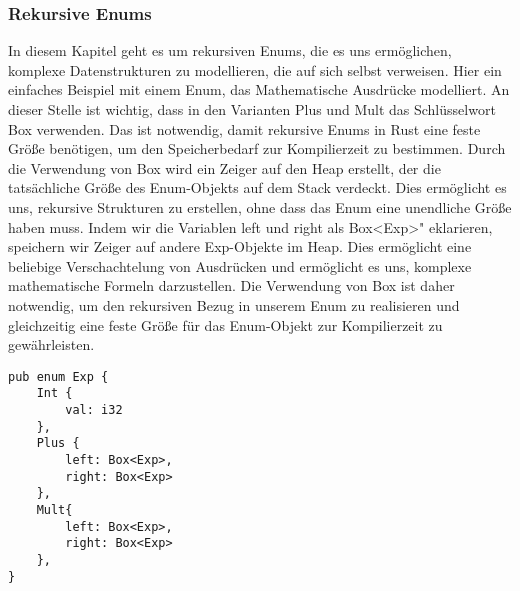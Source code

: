 \documentclass[a4paper, 1ppt]{article}
\begin{document}
\subsubsection{Rekursive Enums}
In diesem Kapitel geht es um rekursiven Enums, die es uns ermöglichen, komplexe Datenstrukturen zu modellieren, die auf sich selbst verweisen. 
Hier ein einfaches Beispiel mit einem Enum, das Mathematische Ausdrücke modelliert.
An dieser Stelle ist wichtig, dass in den Varianten Plus und Mult das Schlüsselwort Box verwenden. Das ist notwendig, damit rekursive Enums in Rust eine feste Größe benötigen, um den Speicherbedarf zur Kompilierzeit zu bestimmen. Durch die Verwendung von Box wird ein Zeiger auf den Heap erstellt, der die tatsächliche Größe des Enum-Objekts auf dem Stack verdeckt. Dies ermöglicht es uns, rekursive Strukturen zu erstellen, ohne dass das Enum eine unendliche Größe haben muss.
Indem wir die Variablen left und right als Box<Exp>" eklarieren, speichern wir Zeiger auf andere Exp-Objekte im Heap. Dies ermöglicht eine beliebige Verschachtelung von Ausdrücken und ermöglicht es uns, komplexe mathematische Formeln darzustellen.
Die Verwendung von Box ist daher notwendig, um den rekursiven Bezug in unserem Enum zu realisieren und gleichzeitig eine feste Größe für das Enum-Objekt zur Kompilierzeit zu gewährleisten. 
\newpage
\begin{verbatim}
pub enum Exp {
    Int {
        val: i32
    },
    Plus {
        left: Box<Exp>,
        right: Box<Exp>
    },
    Mult{
        left: Box<Exp>,
        right: Box<Exp>
    },
}
\end{verbatim}
\end{document}
